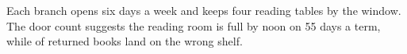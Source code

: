 Each branch opens six days a week and keeps four reading tables by the window.
The door count suggests the reading room is full by noon on 55 days a term, while  of returned books land on the wrong shelf.
